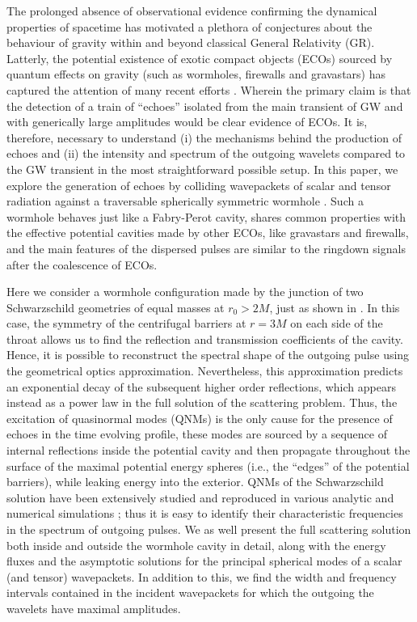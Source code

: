 \documentclass[article,aps,nofootinbib,twocolumn,superscriptaddress]{revtex4-1}
\begin{document}
The prolonged absence of observational evidence confirming the dynamical properties of spacetime has motivated a plethora of conjectures about the behaviour of gravity within and beyond \citep{Clifton:2011jh, Taliotis:2012sx, Joyce:2014kja} classical General Relativity (GR). Latterly, the potential existence of exotic compact objects (ECOs) sourced by quantum effects on gravity \citep{PhysRevLett.61.1446, Almheiri:2012rt, Mazur:2001fv} (such as wormholes, firewalls and gravastars) has captured the attention of many recent efforts \citep{Cardoso:2016oxy, Abedi:2016hgu, Abedi:2018npz}. Wherein the primary claim is that the detection of a train of ``echoes'' isolated from the main transient of GW and with generically large amplitudes would be clear evidence of ECOs. It is, therefore, necessary to understand (i) the mechanisms behind the production of echoes and (ii) the intensity and spectrum of the outgoing wavelets compared to the GW transient in the most straightforward possible setup. In this paper, we explore the generation of echoes by colliding wavepackets of scalar and tensor radiation against a traversable spherically symmetric wormhole \citep{Visser:1989kh}. Such a wormhole behaves just like a Fabry-Perot cavity, shares common properties with the effective potential cavities made by other ECOs, like gravastars and firewalls, and the main features of the dispersed pulses are similar to the ringdown signals after the coalescence of ECOs.

Here we consider a wormhole configuration made by the junction of two Schwarzschild geometries of equal masses at $r_0>2M$, just as shown in \citep{Cardoso:2016oxy}. In this case, the symmetry of the centrifugal barriers at $r=3M$ on each side of the throat allows us to find the reflection and transmission coefficients of the cavity. Hence, it is possible to reconstruct the spectral shape of the outgoing pulse using the geometrical optics approximation. Nevertheless, this approximation predicts an exponential decay of the subsequent higher order reflections, which appears instead as a power law in the full solution of the scattering problem. Thus, the excitation of quasinormal modes (QNMs) is the only cause for the presence of echoes in the time evolving profile, these modes are sourced by a sequence of internal reflections inside the potential cavity and then propagate throughout the surface of the maximal potential energy spheres (i.e., the ``edges'' of the potential barriers), while leaking energy into the exterior. QNMs of the Schwarzschild solution have been extensively studied and reproduced in various analytic and numerical simulations \citep{Chandrasekhar:1975zza, PhysRevD.46.4179}; thus it is easy to identify their characteristic frequencies in the spectrum of outgoing pulses. We as well present the full scattering solution both inside and outside the wormhole cavity in detail, along with the energy fluxes and the asymptotic solutions for the principal spherical modes of a scalar (and tensor) wavepackets. In addition to this, we find the width and frequency intervals contained in the incident wavepackets for which the outgoing the wavelets have maximal amplitudes.
\end{document}

